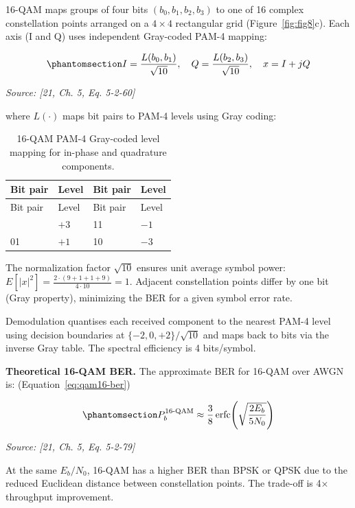 16-QAM maps groups of four bits \((b_0, b_1, b_2, b_3)\) to one of 16 complex constellation points arranged on a \(4 \times 4\) rectangular grid (Figure~\ref{fig:fig8}c). Each axis (I and Q) uses independent Gray-coded PAM-4 mapping:

\begin{equation}\protect\phantomsection\label{eq:qam16-mapping}{I = \frac{L(b_0, b_1)}{\sqrt{10}}, \quad Q = \frac{L(b_2, b_3)}{\sqrt{10}}, \quad x = I + jQ
}\end{equation} \par{\small\textit{Source: [21, Ch. 5, Eq. 5-2-60]}}

where \(L(\cdot)\) maps bit pairs to PAM-4 levels using Gray coding:

\begin{longtable}[]{@{}llll@{}}
\caption{16-QAM PAM-4 Gray-coded level mapping for in-phase and quadrature components.}\label{tbl:table30}\tabularnewline
\toprule\noalign{}
Bit pair & Level & Bit pair & Level \\
\midrule\noalign{}
\endfirsthead
\toprule\noalign{}
Bit pair & Level & Bit pair & Level \\
\midrule\noalign{}
\endhead
\bottomrule\noalign{}
\endlastfoot
00 & \(+3\) & 11 & \(-1\) \\
01 & \(+1\) & 10 & \(-3\) \\
\end{longtable}

The normalization factor \(\sqrt{10}\) ensures unit average symbol power: \(E[|x|^2] = \frac{2 \cdot (9+1+1+9)}{4 \cdot 10} = 1\). Adjacent constellation points differ by one bit (Gray property), minimizing the BER for a given symbol error rate.

Demodulation quantises each received component to the nearest PAM-4 level using decision boundaries at \(\{-2, 0, +2\}/\sqrt{10}\) and maps back to bits via the inverse Gray table. The spectral efficiency is 4 bits/symbol.

\textbf{Theoretical 16-QAM BER.} The approximate BER for 16-QAM over AWGN is: (Equation~\ref{eq:qam16-ber})

\begin{equation}\protect\phantomsection\label{eq:qam16-ber}{P_b^{\text{16-QAM}} \approx \frac{3}{8} \operatorname{erfc}\!\left(\sqrt{\frac{2E_b}{5N_0}}\right)
}\end{equation} \par{\small\textit{Source: [21, Ch. 5, Eq. 5-2-79]}}

At the same \(E_b/N_0\), 16-QAM has a higher BER than BPSK or QPSK due to the reduced Euclidean distance between constellation points. The trade-off is 4× throughput improvement.

